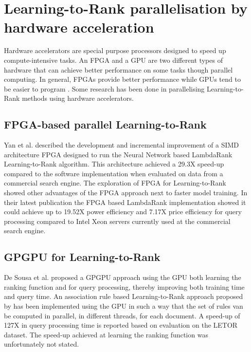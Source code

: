 \section{Learning-to-Rank parallelisation by hardware acceleration}
Hardware accelerators are special purpose processors designed to speed up compute-intensive tasks. An \ac{FPGA} and a \ac{GPU} are two different types of hardware that can achieve better performance on some tasks though parallel computing. In general, \ac{FPGA}s provide better performance while \ac{GPU}s tend to be easier to program \cite{Che2008}. Some research has been done in parallelising Learning-to-Rank methods using hardware accelerators.

\subsection{FPGA-based parallel Learning-to-Rank}
Yan et al. \cite{Yan2009,Yan2010,Yan2011,Yan2012} described the development and incremental improvement of a \ac{SIMD} architecture \ac{FPGA} designed to run the Neural Network based LambdaRank Learning-to-Rank algorithm. This architecture achieved a 29.3X speed-up compared to the software implementation when evaluated on data from a commercial search engine. The exploration of \ac{FPGA} for Learning-to-Rank showed other advantages of the \ac{FPGA} approach next to faster model training. In their latest publication \cite{Yan2012} the \ac{FPGA} based LambdaRank implementation showed it could achieve up to 19.52X power efficiency and 7.17X price efficiency for query processing compared to Intel Xeon servers currently used at the commercial search engine.

\subsection{GPGPU for Learning-to-Rank}
De Sousa et al. \cite{DeSousa2012} proposed a \ac{GPGPU} approach using the \ac{GPU} both learning the ranking function and for query processing, thereby improving both training time and query time. An association rule based Learning-to-Rank approach proposed by \cite{Veloso2008} has been implemented using the \ac{GPU} in such a way that the set of rules van be computed in parallel, in different threads, for each document. A speed-up of 127X in query processing time is reported based on evaluation on the LETOR dataset. The speed-up achieved at learning the ranking function was unfortunately not stated.\\

